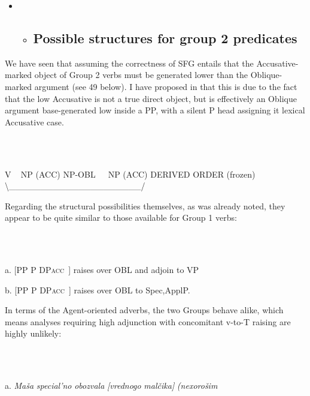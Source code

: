 \documentclass[output=paper,modfonts, nonflat]{langsci/langscibook}
\begin{document}
\begin{itemize}
\item \begin{itemize}
\item \subsection{Possible structures for group 2 predicates}
\end{itemize}
\end{itemize}

We have seen that assuming the correctness of SFG entails that the Accusative-marked object of Group 2 verbs must be generated lower than the Oblique-marked argument (see 49 below). I have proposed in \citet{Antonyuk2015} that this is due to the fact that the low Accusative is not a true direct object, but is effectively an Oblique argument base-generated low inside a PP, with a silent P head assigning it lexical Accusative case. 

\ea%
    \label{ex:key:49}
    \gll\\
        \\
    \glt
    \z

        

V ~ NP (ACC) NP-OBL~~~NP (ACC)  DERIVED ORDER (frozen)  ~                               {\textbackslash}\_\_\_\_\_\_\_\_\_\_\_\_\_\_\_\_\_\_\_\_\_/

Regarding the structural possibilities themselves, as was already noted, they appear to be quite similar to those available for Group 1 verbs:

\begin{styleinnerExample}
\ea%
    \label{ex:key:50}
    \gll\\
        \\
    \glt
    \z

          a.   [PP P DP\textsc{acc~}] raises over OBL and adjoin to VP
\end{styleinnerExample}

\begin{styleinnerExample}
  b.   [PP P DP\textsc{acc~]}\textsubscript{} raises over OBL to Spec,ApplP.
\end{styleinnerExample}

In terms of the Agent-oriented adverbs, the two Groups behave alike, which means analyses requiring high adjunction with concomitant v-to-T raising are highly unlikely:

\begin{styleinnerExample}
\ea%
    \label{ex:key:51}
    \gll\\
        \\
    \glt
    \z

           a.  \textit{Maša}   \textit{special’no}    \textit{obozvala} \textit{[vrednogo}  \textit{malčika]} \textit{(nexorošim}
\end{styleinnerExample}
\end{document}
